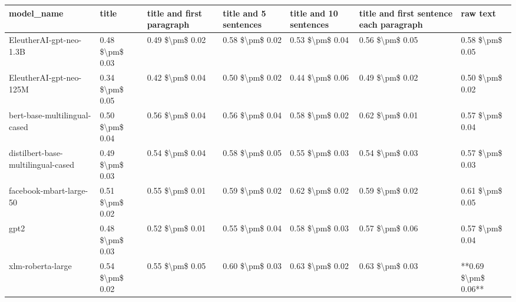\begin{tabular}{lllllll}
\toprule
                        model\_name &           title & title and first paragraph & title and 5 sentences & title and 10 sentences & title and first sentence each paragraph &            raw text \\
\midrule
           EleutherAI-gpt-neo-1.3B & 0.48 \$\textbackslash pm\$ 0.03 &           0.49 \$\textbackslash pm\$ 0.02 &       0.58 \$\textbackslash pm\$ 0.02 &        0.53 \$\textbackslash pm\$ 0.04 &                         0.56 \$\textbackslash pm\$ 0.05 &     0.58 \$\textbackslash pm\$ 0.05 \\
           EleutherAI-gpt-neo-125M & 0.34 \$\textbackslash pm\$ 0.05 &           0.42 \$\textbackslash pm\$ 0.04 &       0.50 \$\textbackslash pm\$ 0.02 &        0.44 \$\textbackslash pm\$ 0.06 &                         0.49 \$\textbackslash pm\$ 0.02 &     0.50 \$\textbackslash pm\$ 0.02 \\
      bert-base-multilingual-cased & 0.50 \$\textbackslash pm\$ 0.04 &           0.56 \$\textbackslash pm\$ 0.04 &       0.56 \$\textbackslash pm\$ 0.04 &        0.58 \$\textbackslash pm\$ 0.02 &                         0.62 \$\textbackslash pm\$ 0.01 &     0.57 \$\textbackslash pm\$ 0.04 \\
distilbert-base-multilingual-cased & 0.49 \$\textbackslash pm\$ 0.03 &           0.54 \$\textbackslash pm\$ 0.04 &       0.58 \$\textbackslash pm\$ 0.05 &        0.55 \$\textbackslash pm\$ 0.03 &                         0.54 \$\textbackslash pm\$ 0.03 &     0.57 \$\textbackslash pm\$ 0.03 \\
           facebook-mbart-large-50 & 0.51 \$\textbackslash pm\$ 0.02 &           0.55 \$\textbackslash pm\$ 0.01 &       0.59 \$\textbackslash pm\$ 0.02 &        0.62 \$\textbackslash pm\$ 0.02 &                         0.59 \$\textbackslash pm\$ 0.02 &     0.61 \$\textbackslash pm\$ 0.05 \\
                              gpt2 & 0.48 \$\textbackslash pm\$ 0.03 &           0.52 \$\textbackslash pm\$ 0.01 &       0.55 \$\textbackslash pm\$ 0.04 &        0.58 \$\textbackslash pm\$ 0.03 &                         0.57 \$\textbackslash pm\$ 0.06 &     0.57 \$\textbackslash pm\$ 0.04 \\
                 xlm-roberta-large & 0.54 \$\textbackslash pm\$ 0.02 &           0.55 \$\textbackslash pm\$ 0.05 &       0.60 \$\textbackslash pm\$ 0.03 &        0.63 \$\textbackslash pm\$ 0.02 &                         0.63 \$\textbackslash pm\$ 0.03 & **0.69 \$\textbackslash pm\$ 0.06** \\
\bottomrule
\end{tabular}
